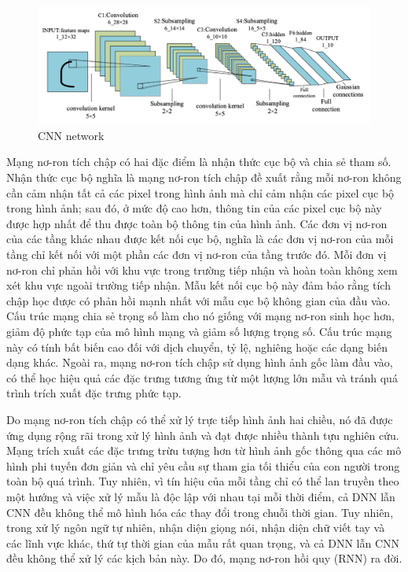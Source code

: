 \documentclass[a4paper]{article}
\begin{document}
\begin{figure}
    \centering
    \includegraphics[width=1\linewidth]{assets/cnn-network.png}
    \caption{CNN network}
    \label{fig:enter-label}
\end{figure}

Mạng nơ-ron tích chập có hai đặc điểm là nhận thức cục bộ và chia sẻ tham số. Nhận thức cục bộ nghĩa là mạng nơ-ron tích chập đề xuất rằng mỗi nơ-ron không cần cảm nhận tất cả các pixel trong hình ảnh mà chỉ cảm nhận các pixel cục bộ trong hình ảnh; sau đó, ở mức độ cao hơn, thông tin của các pixel cục bộ này được hợp nhất để thu được toàn bộ thông tin của hình ảnh. Các đơn vị nơ-ron của các tầng khác nhau được kết nối cục bộ, nghĩa là các đơn vị nơ-ron của mỗi tầng chỉ kết nối với một phần các đơn vị nơ-ron của tầng trước đó. Mỗi đơn vị nơ-ron chỉ phản hồi với khu vực trong trường tiếp nhận và hoàn toàn không xem xét khu vực ngoài trường tiếp nhận. Mẫu kết nối cục bộ này đảm bảo rằng tích chập học được có phản hồi mạnh nhất với mẫu cục bộ không gian của đầu vào. Cấu trúc mạng chia sẻ trọng số làm cho nó giống với mạng nơ-ron sinh học hơn, giảm độ phức tạp của mô hình mạng và giảm số lượng trọng số. Cấu trúc mạng này có tính bất biến cao đối với dịch chuyển, tỷ lệ, nghiêng hoặc các dạng biến dạng khác. Ngoài ra, mạng nơ-ron tích chập sử dụng hình ảnh gốc làm đầu vào, có thể học hiệu quả các đặc trưng tương ứng từ một lượng lớn mẫu và tránh quá trình trích xuất đặc trưng phức tạp.

Do mạng nơ-ron tích chập có thể xử lý trực tiếp hình ảnh hai chiều, nó đã được ứng dụng rộng rãi trong xử lý hình ảnh và đạt được nhiều thành tựu nghiên cứu. Mạng trích xuất các đặc trưng trừu tượng hơn từ hình ảnh gốc thông qua các mô hình phi tuyến đơn giản và chỉ yêu cầu sự tham gia tối thiểu của con người trong toàn bộ quá trình. Tuy nhiên, vì tín hiệu của mỗi tầng chỉ có thể lan truyền theo một hướng và việc xử lý mẫu là độc lập với nhau tại mỗi thời điểm, cả DNN lẫn CNN đều không thể mô hình hóa các thay đổi trong chuỗi thời gian. Tuy nhiên, trong xử lý ngôn ngữ tự nhiên, nhận diện giọng nói, nhận diện chữ viết tay và các lĩnh vực khác, thứ tự thời gian của mẫu rất quan trọng, và cả DNN lẫn CNN đều không thể xử lý các kịch bản này. Do đó, mạng nơ-ron hồi quy (RNN) ra đời.
\end{document}
